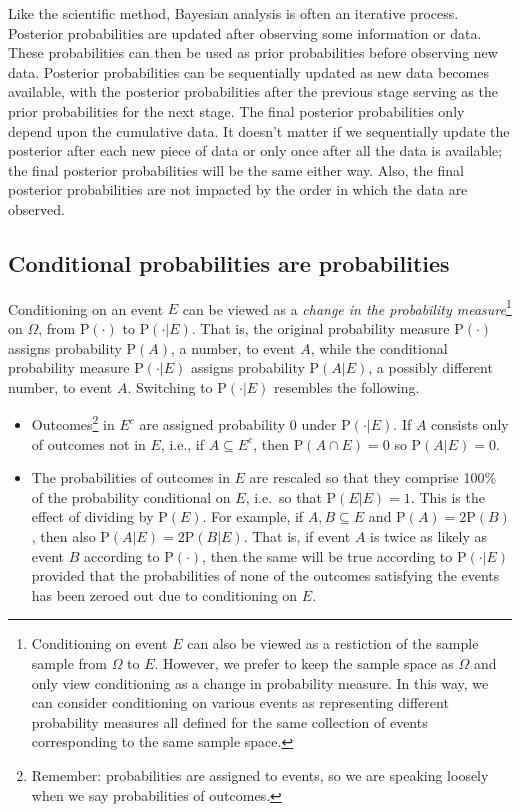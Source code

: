 \documentclass[
  letterpaper,
  DIV=11,
  numbers=noendperiod]{scrreprt}
\providecommand{\tightlist}{%
  \setlength{\itemsep}{0pt}\setlength{\parskip}{0pt}}
\theoremstyle{plain}
\theoremstyle{definition}
\theoremstyle{definition}
\theoremstyle{definition}
\theoremstyle{remark}
\begin{document}
Like the scientific method, Bayesian analysis is often an iterative
process. Posterior probabilities are updated after observing some
information or data. These probabilities can then be used as prior
probabilities before observing new data. Posterior probabilities can be
sequentially updated as new data becomes available, with the posterior
probabilities after the previous stage serving as the prior
probabilities for the next stage. The final posterior probabilities only
depend upon the cumulative data. It doesn't matter if we sequentially
update the posterior after each new piece of data or only once after all
the data is available; the final posterior probabilities will be the
same either way. Also, the final posterior probabilities are not
impacted by the order in which the data are observed.

\subsection{Conditional probabilities are
probabilities}\label{conditional-probabilities-are-probabilities}

Conditioning on an event \(E\) can be viewed as a \emph{change in the
probability measure}\footnote{Conditioning on event \(E\) can also be
  viewed as a restiction of the sample sample from \(\Omega\) to \(E\).
  However, we prefer to keep the sample space as \(\Omega\) and only
  view conditioning as a change in probability measure. In this way, we
  can consider conditioning on various events as representing different
  probability measures all defined for the same collection of events
  corresponding to the same sample space.} on \(\Omega\), from
\(\textrm{P}(\cdot)\) to \(\textrm{P}(\cdot|E)\). That is, the original
probability measure \(\textrm{P}(\cdot)\) assigns probability
\(\textrm{P}(A)\), a number, to event \(A\), while the conditional
probability measure \(\textrm{P}(\cdot |E)\) assigns probability
\(\textrm{P}(A|E)\), a possibly different number, to event \(A\).
Switching to \(\textrm{P}(\cdot |E)\) resembles the following.

\begin{itemize}
\tightlist
\item
  Outcomes\footnote{Remember: probabilities are assigned to events, so
    we are speaking loosely when we say probabilities of outcomes.} in
  \(E^c\) are assigned probability 0 under \(\textrm{P}(\cdot|E)\). If
  \(A\) consists only of outcomes not in \(E\), i.e., if
  \(A\subseteq E^c\), then \(\textrm{P}(A\cap E)=0\) so
  \(\textrm{P}(A|E)=0\).
\item
  The probabilities of outcomes in \(E\) are rescaled so that they
  comprise 100\% of the probability conditional on \(E\), i.e.~so that
  \(\textrm{P}(E|E)=1\). This is the effect of dividing by
  \(\textrm{P}(E)\). For example, if \(A, B\subseteq E\) and
  \(\textrm{P}(A)=2\textrm{P}(B)\), then also
  \(\textrm{P}(A|E)=2\textrm{P}(B|E)\). That is, if event \(A\) is twice
  as likely as event \(B\) according to \(\textrm{P}(\cdot)\), then the
  same will be true according to \(\textrm{P}(\cdot|E)\) provided that
  the probabilities of none of the outcomes satisfying the events has
  been zeroed out due to conditioning on \(E\).
\end{itemize}
\end{document}
